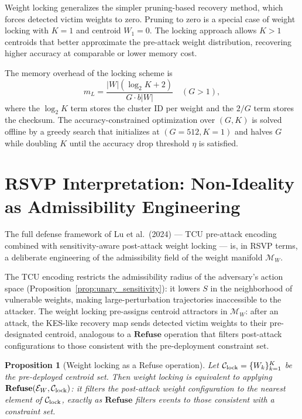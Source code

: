 \documentclass[11pt, openright, twoside]{book}
\theoremstyle{plain}
\newtheorem{proposition}[theorem]{Proposition}
\theoremstyle{definition}
\theoremstyle{remark}
\newcommand{\Sfield}{S}
\newcommand{\Refuse}{\mathbf{Refuse}}
\begin{document}
Weight locking generalizes the simpler pruning-based recovery method, which forces
detected victim weights to zero. Pruning to zero is a special case of weight locking
with $K=1$ and centroid $W_1=0$. The locking approach allows $K>1$ centroids that
better approximate the pre-attack weight distribution, recovering higher accuracy
at comparable or lower memory cost.

The memory overhead of the locking scheme is
\begin{equation}
  m_L = \frac{|W|(\log_2 K + 2)}{G \cdot b|W|} \quad (G > 1),
\end{equation}
where the $\log_2 K$ term stores the cluster ID per weight and the $2/G$ term stores
the checksum. The accuracy-constrained optimization over $(G, K)$ is solved offline
by a greedy search that initializes at $(G=512, K=1)$ and halves $G$ while doubling
$K$ until the accuracy drop threshold $\eta$ is satisfied.

\section{RSVP Interpretation: Non-Ideality as Admissibility Engineering}

The full defense framework of Lu et al.\ (2024) --- TCU pre-attack encoding combined
with sensitivity-aware post-attack weight locking --- is, in RSVP terms, a deliberate
engineering of the admissibility field of the weight manifold $\mathcal{M}_W$.

The TCU encoding restricts the admissibility radius of the adversary's action space
(Proposition~\ref{prop:unary_sensitivity}): it lowers $\Sfield$ in the neighborhood of
vulnerable weights, making large-perturbation trajectories inaccessible to the attacker.
The weight locking pre-assigns centroid attractors in $\mathcal{M}_W$: after an attack,
the KES-like recovery map sends detected victim weights to their pre-designated centroid,
analogous to a $\Refuse$ operation that filters post-attack configurations to those
consistent with the pre-deployment constraint set.

\begin{proposition}[Weight locking as a Refuse operation]
\label{prop:locking_as_refuse}
Let $\mathcal{C}_{\rm lock} = \{W_k\}_{k=1}^K$ be the pre-deployed centroid set. Then
weight locking is equivalent to applying $\Refuse(\mathcal{E}_W, \mathcal{C}_{\rm lock})$:
it filters the post-attack weight configuration to the nearest element of
$\mathcal{C}_{\rm lock}$, exactly as $\Refuse$ filters events to those consistent
with a constraint set.
\end{proposition}
\end{document}
